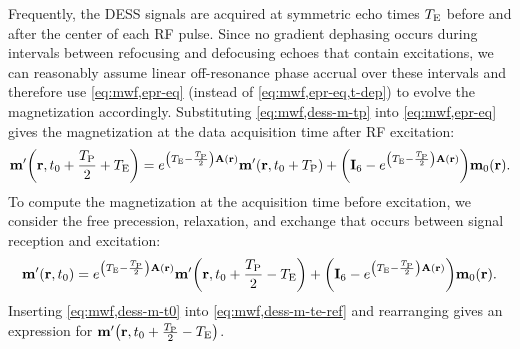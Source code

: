 Frequently,
the DESS signals are acquired
at symmetric echo times $T_\mathrm{E}$ before and after
the center of each RF pulse.
Since no gradient dephasing occurs
during intervals
between refocusing and defocusing echoes
that contain excitations,
we can reasonably assume
linear off-resonance phase accrual 
over these intervals
and therefore use \eqref{eq:mwf,epr-eq} 
(instead of \eqref{eq:mwf,epr-eq,t-dep})
to evolve the magnetization accordingly.
Substituting \eqref{eq:mwf,dess-m-tp} 
into \eqref{eq:mwf,epr-eq}
gives the magnetization
at the data acquisition time
after RF excitation:
\begin{align}
	\bmmp\paren{\bmr,t_0+\frac{\TP}{2}+\TE} =
		e^{\paren{\TE-\frac{\TP}{2}}\bmA\pr} \bmmp\paren{\bmr,t_0+\TP} 
		+ \paren{\eye{6} - e^{\paren{\TE-\frac{\TP}{2}}\bmA\pr}} \bmmzero\pr.
	\label{eq:mwf,dess-m-te-def}
\end{align}
To compute the magnetization
at the acquisition time 
before excitation,
we consider the free precession, relaxation, and exchange
that occurs between signal reception and excitation:
\begin{align}
	\bmmp\prtz =
		e^{\paren{\TE-\frac{\TP}{2}}\bmA\pr} \bmmp\paren{\bmr,t_0+\frac{\TP}{2}-\TE} 
		+ \paren{\eye{6} - e^{\paren{\TE-\frac{\TP}{2}}\bmA\pr}} \bmmzero\pr.
	\label{eq:mwf,dess-m-te-ref}
\end{align}
Inserting \eqref{eq:mwf,dess-m-t0}
into \eqref{eq:mwf,dess-m-te-ref}
and rearranging 
gives an expression 
for $\bmmp\paren{\bmr,t_0+\frac{\TP}{2}-\TE}$.

